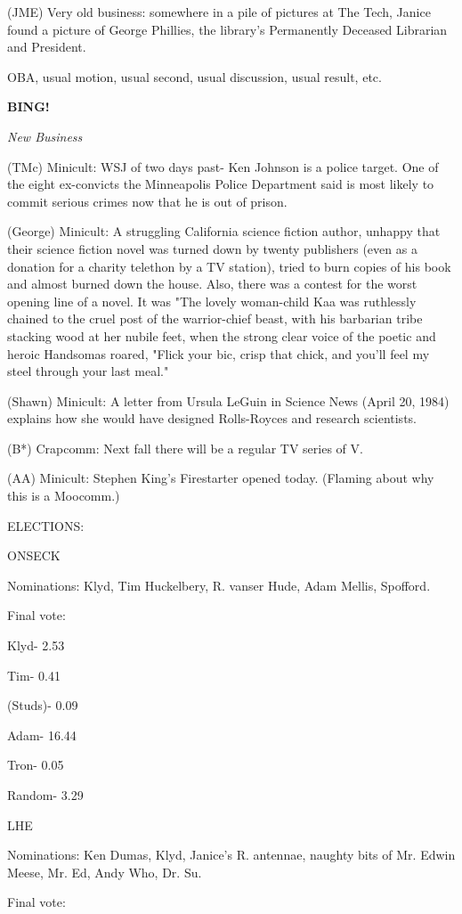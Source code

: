 \documentclass[12pt]{article}
\newcommand{\bing}{{\bf BING!} }
\newcommand{\goto}[1]{\bing \vskip 12pt \centerline{{\em{#1}}}}
\begin{document}
(JME) Very old business: somewhere in a pile of pictures at The Tech, Janice found a picture of George Phillies, the library's Permanently Deceased Librarian and President.

OBA, usual motion, usual second, usual discussion, usual result, etc.

\goto{New Business}

(TMc) Minicult: WSJ of two days past- Ken Johnson is a police target. One of the eight ex-convicts the Minneapolis Police Department said is most likely to commit serious crimes now that he is out of prison.

(George) Minicult: A struggling California science fiction author, unhappy that their science fiction novel was turned down by twenty publishers (even as a donation for a charity telethon by a TV station), tried to burn copies of his book and almost burned down the house. Also, there was a contest for the worst opening line of a novel. It was "The lovely woman-child Kaa was ruthlessly chained to the cruel post of the warrior-chief beast, with his barbarian tribe stacking wood at her nubile feet, when the strong clear voice of the poetic and heroic Handsomas roared, "Flick your bic, crisp that chick, and you'll feel my steel through your last meal."

(Shawn) Minicult: A letter from Ursula LeGuin in Science News (April 20, 1984) explains how she would have designed Rolls-Royces and research scientists.

(B*) Crapcomm: Next fall there will be a regular TV series of V.

(AA) Minicult: Stephen King's Firestarter opened today. (Flaming about why this is a Moocomm.)

ELECTIONS:

ONSECK

Nominations: Klyd, Tim Huckelbery, R. vanser Hude, Adam Mellis, Spofford.

Final vote:

Klyd- 2.53

Tim- 0.41

(Studs)- 0.09

Adam- 16.44

Tron- 0.05

Random- 3.29

LHE

Nominations: Ken Dumas, Klyd, Janice's R. antennae, naughty bits of Mr. Edwin Meese, Mr. Ed, Andy Who, Dr. Su.

Final vote:
\end{document}
